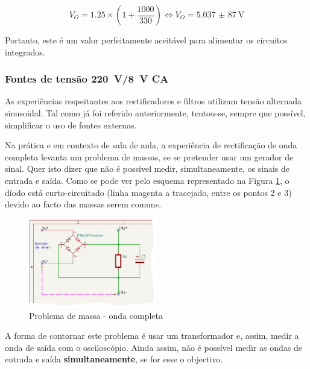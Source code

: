 \begin{equation} \label{eq:confirmacaoVout}
	V_{O} = 1.25 \times (1 + \frac{1000}{330}) \Leftrightarrow V_{O} = \SI{5,037(87)}{\volt}
\end{equation}

Portanto, este é um valor perfeitamente aceitável para alimentar os circuitos integrados.

\subsubsection{Fontes de tensão \SI{220}{\volt}/\SI{8}{\volt} CA}
\label{sec:fontealternada}
As experiências respeitantes aos rectificadores e filtros utilizam tensão alternada sinusoidal. Tal como já foi referido anteriormente, tentou-se, sempre que possível, simplificar o uso de fontes externas. 

Na prática e em contexto de sala de aula, a experiência de rectificação de onda completa levanta um problema de massas, se se pretender usar um gerador de sinal. Quer isto dizer que não é possível medir, simultaneamente, os sinais de entrada e saída. Como se pode ver pelo esquema representado na Figura \ref{fig:gerador-massa}, o díodo está curto-circuitado (linha magenta a tracejado, entre os pontos 2 e 3) devido ao facto das massas serem comuns. 

\begin{figure}[hbtp]
	\centering
	\includegraphics[width=0.5\textwidth]{figures/sch_completa_CC.png}
	\caption{Problema de massa - onda completa}
	\label{fig:gerador-massa}
\end{figure}

A forma de contornar este problema é usar um transformador e, assim, medir a onda de saída com o osciloscópio. Ainda assim, não é possível medir as ondas de entrada e saída \textbf{simultaneamente}, se for esse o objectivo.

